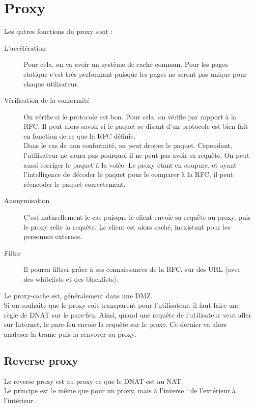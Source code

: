 \section{Proxy}
Les qutres fonctions du proxy sont :
\begin{description}
 \item[L'accélération] Pour cela, on va avoir un système de cache commun. Pour les pages statique c'est très performant puisque les pages ne seront pas unique pour chaque utilisateur. 
 \item[Vérification de la conformité] On vérifie si le protocole est bon. Pour cela, on vérifie par rapport à la RFC. Il peut alors savoir si le paquet se disant d'un protocole est bien fait en fonction de ce que la RFC définie.\\Dans le cas de non conformité, on peut droper le paquet. Cependant, l'utilisateur ne saura pas pourquoi il ne peut pas avoir sa requête. On peut aussi corriger le paquet à la volée. Le proxy étant en coupure, et ayant l'intelligence de décoder le paquet pour le comparer à la RFC, il peut réencoder le paquet correctement.
 \item[Anonymisation] C'est naturellement le cas puisque le client envoie sa requête au proxy, puis le proxy relie la requête. Le client est alors caché, inexistant pour les personnes externes.
 \item[Filtre] Il pourra filtrer grâce à ses connaissances de la RFC, sur des URL (avec des whitelists et des blacklists).
\end{description}
Le proxy-cache est, généralement dans une DMZ.\\
Si on souhaite que le proxy soit transparent pour l'utilisateur, il faut faire une règle de DNAT sur le pare-feu. Ainsi, quand une requête de l'utilisateur veut aller sur Internet, le pare-feu envoie la requête sur le proxy. Ce dernier va alors analyser la trame puis la renvoyer au proxy.
\subsection{Reverse proxy}
Le reverse proxy est au proxy ce que le DNAT est au NAT.\\ Le principe est le même que pour un proxy, mais à l'inverse : de l'extérieur à l'intérieur.